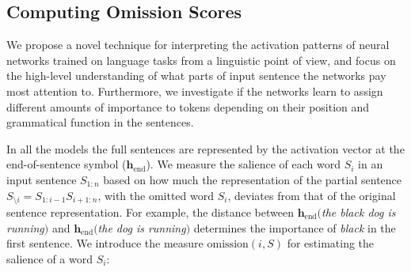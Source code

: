 
\subsection{Computing Omission Scores}
\label{sec:computeomission}

We propose a novel technique for interpreting the
activation patterns of neural networks trained on language tasks
from a linguistic point of view, and focus
on the high-level understanding of what parts of input sentence the networks
pay most attention to. Furthermore, we investigate if the networks
learn to assign different amounts of importance to tokens depending
on their position and grammatical function in the sentences.\label{edit:whyposdep}

In all the models the full sentences are represented by the
activation vector at the end-of-sentence symbol
($\mathbf{h}_\text{end}$). We measure the salience of each word $S_i$
in an input sentence $S_{1:n}$ based on how much the representation of the
partial sentence $S_{\setminus i} = S_{1:i-1}S_{i+1:n}$, with
the omitted word $S_i$, deviates from that of the original sentence
representation. For example, the distance
between $\mathbf{h}_\text{end}(${\it the black dog is running}$)$
and $\mathbf{h}_\text{end}(${\it the dog is running}$)$ determines
the importance of {\it black} in the first sentence. We introduce the
measure $\mathrm{omission}(i,S)$ for estimating the salience of a word $S_i$:

